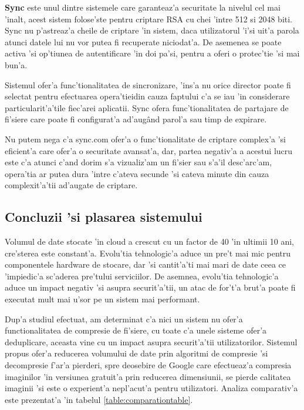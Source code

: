 \documentclass[12pt,a4paper,twoside]{report}
\begin{document}
\textbf{Sync} este unul dintre sistemele care garanteaz'a securitate la nivelul cel mai 'inalt, acest sistem folose'ste pentru criptare RSA cu chei 'intre 512 si 2048 biti. Sync nu p'astreaz'a cheile de criptare 'in sistem, daca utilizatorul 'i'si uit'a parola atunci datele lui nu vor putea fi recuperate niciodat'a. De asemenea se poate activa 'si op'tiunea de autentificare 'in doi pa'si, pentru a oferi o protec'tie 'si mai bun'a.

Sistemul ofer'a func'tionalitatea de sincronizare, 'ins'a nu orice director poate fi selectat pentru efectuarea opera'tieidin cauza faptului c'a se iau 'in considerare particularit'a'tile fiec'arei aplicatii. 
Sync ofera func'tionalitatea de partajare de fi'siere care poate fi configurat'a ad'augând parol'a sau timp de expirare.


Nu putem nega c'a sync.com ofer'a o func'tionalitate de criptare complex'a 'si eficient'a care ofer'a o securitate avansat'a, dar, partea negativ'a a acestui lucru este c'a atunci c'and dorim s'a vizualiz'am un fi'sier sau s'a'il desc'arc'am, opera'tia ar putea dura 'intre c'ateva secunde 'si cateva minute din cauza complexit'a'tii ad'augate de criptare.


\subsection{Concluzii 'si plasarea sistemului}
Volumul de date stocate 'in cloud a crescut cu un factor de 40 'in ultimii 10 ani, cre'sterea este constant'a.  Evolu'tia tehnologic'a aduce un pre't mai mic pentru componentele hardware de stocare, dar 'si cantit'a'ti mai mari de date ceea ce 'impiedic'a sc'aderea pre'tului serviciilor. De asemnea, evolu'tia tehnologic'a aduce un impact negativ 'si asupra securit'a'tii, un atac de for't'a brut'a poate fi executat mult mai u'sor pe un sistem mai performant.

Dup'a studiul efectuat, am determinat c'a nici un sistem nu ofer'a functionalitatea de compresie de fi'siere, cu toate c'a unele sisteme ofer'a deduplicare, aceasta vine cu un impact asupra securit'a'tii utilizatorilor. Sistemul propus ofer'a reducerea volumului de date prin algoritmi de compresie 'si decompresie f'ar'a pierderi, spre deosebire de Google care efectueaz'a compresia imaginilor 'in versiunea gratuit'a prin reducerea dimensiunii, se pierde calitatea imaginii 'si este o experient'a nepl'acut'a pentru utilizatori. Analiza comparativ'a este prezentat'a 'in tabelul \ref{table:comparationtable}.
\end{document}
